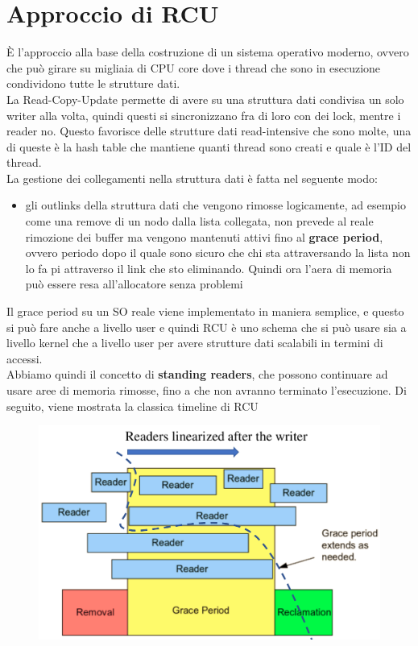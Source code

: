 \documentclass[12pt, oneside]{extbook}
\begin{document}
\section{Approccio di RCU}
È l'approccio alla base della costruzione di un sistema operativo moderno, ovvero che può girare su migliaia di CPU core dove i thread che sono in esecuzione condividono tutte le strutture dati.\\ La Read-Copy-Update permette di avere su una struttura dati condivisa un solo writer alla volta, quindi questi si sincronizzano fra di loro con dei lock, mentre i reader no. Questo favorisce delle strutture dati read-intensive che sono molte, una di queste è la hash table che mantiene quanti thread sono creati e quale è l'ID del thread.\\ La gestione dei collegamenti nella struttura dati è fatta nel seguente modo:
\begin{itemize}
\item gli outlinks della struttura dati che vengono rimosse logicamente, ad esempio come una remove di un nodo dalla lista collegata, non prevede al reale rimozione dei buffer ma vengono mantenuti attivi fino al \textbf{grace period}, ovvero periodo dopo il quale sono sicuro che chi sta attraversando la lista non lo fa pi attraverso il link che sto eliminando. Quindi ora l'aera di memoria può essere resa all'allocatore senza problemi
\end{itemize}
Il grace period su un SO reale viene implementato in maniera semplice, e questo si può fare anche a livello user e quindi RCU è uno schema che si può usare sia a livello kernel che a livello user per avere strutture dati scalabili in termini di accessi.\\ Abbiamo quindi il concetto di \textbf{standing readers}, che possono continuare ad usare aree di memoria rimosse, fino a che non avranno terminato l'esecuzione. Di seguito, viene mostrata la classica timeline di RCU
\begin{figure}[!h]
\includegraphics[scale=0.3]{immagini/rcu_timeline}
\end{figure}
\end{document}
